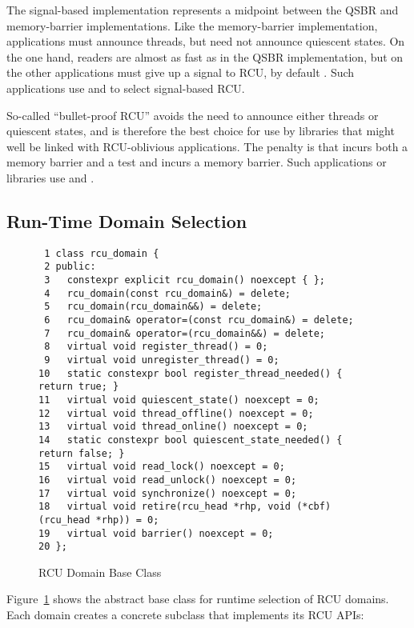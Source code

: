 \documentclass[letterpaper,10pt]{article}
\begin{document}
The signal-based implementation represents a midpoint between the QSBR
and memory-barrier implementations.
Like the memory-barrier implementation, applications must announce
threads, but need not announce quiescent states.
On the one hand, readers are almost as fast as in the QSBR implementation,
but on the other applications must give up a signal to RCU, by default
.
Such applications use  and
 to select signal-based RCU.

So-called ``bullet-proof RCU'' avoids the need to announce either threads
or quiescent states, and is therefore the best choice for use by
libraries that might well be linked with RCU-oblivious applications.
The penalty is that  incurs both a memory barrier
and a test and  incurs a memory barrier.
Such applications or libraries use  and
.

\subsection{Run-Time Domain Selection}
\label{sec:Run-Time Domain Selection}

\begin{figure}[tbp]
{ \scriptsize
\begin{verbatim}
 1 class rcu_domain {
 2 public:
 3   constexpr explicit rcu_domain() noexcept { };
 4   rcu_domain(const rcu_domain&) = delete;
 5   rcu_domain(rcu_domain&&) = delete;
 6   rcu_domain& operator=(const rcu_domain&) = delete;
 7   rcu_domain& operator=(rcu_domain&&) = delete;
 8   virtual void register_thread() = 0;
 9   virtual void unregister_thread() = 0;
10   static constexpr bool register_thread_needed() { return true; }
11   virtual void quiescent_state() noexcept = 0;
12   virtual void thread_offline() noexcept = 0;
13   virtual void thread_online() noexcept = 0;
14   static constexpr bool quiescent_state_needed() { return false; }
15   virtual void read_lock() noexcept = 0;
16   virtual void read_unlock() noexcept = 0;
17   virtual void synchronize() noexcept = 0;
18   virtual void retire(rcu_head *rhp, void (*cbf)(rcu_head *rhp)) = 0;
19   virtual void barrier() noexcept = 0;
20 };
\end{verbatim}
}
\caption{RCU Domain Base Class}
\label{fig:RCU Domain Base Class}
\end{figure}

Figure~\ref{fig:RCU Domain Base Class}
shows the abstract base class for runtime selection of RCU domains.
Each domain creates a concrete subclass that implements its RCU APIs:
\end{document}
